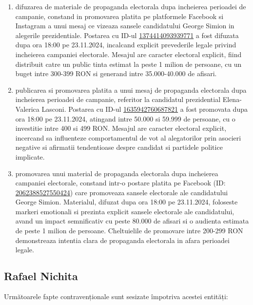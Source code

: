 \documentclass[a4paper,12pt]{article}
\begin{document}
\begin{enumerate}[leftmargin=*, label=\arabic*.)]
    \item difuzarea de materiale de propaganda electorala dupa incheierea perioadei de campanie, constand in promovarea platita pe platformele Facebook si Instagram a unui mesaj ce vizeaza sansele candidatului George Simion in alegerile prezidentiale. Postarea cu ID-ul \href{https://www.facebook.com/ads/library/?id=1374414093939771}{1374414093939771} a fost difuzata dupa ora 18:00 pe 23.11.2024, incalcand explicit prevederile legale privind incheierea campaniei electorale. Mesajul are caracter electoral explicit, fiind distribuit catre un public tinta estimat la peste 1 milion de persoane, cu un buget intre 300-399 RON si generand intre 35.000-40.000 de afisari.
    \item publicarea si promovarea platita a unui mesaj de propaganda electorala dupa incheierea perioadei de campanie, referitor la candidatul prezidential Elena-Valerica Lasconi. Postarea cu ID-ul \href{https://www.facebook.com/ads/library/?id=1635942760687821}{1635942760687821} a fost promovata dupa ora 18:00 pe 23.11.2024, atingand intre 50.000 si 59.999 de persoane, cu o investitie intre 400 si 499 RON. Mesajul are caracter electoral explicit, incercand sa influenteze comportamentul de vot al alegatorilor prin asocieri negative si afirmatii tendentioase despre candidat si partidele politice implicate.
    \item promovarea unui material de propaganda electorala dupa incheierea campaniei electorale, constand intr-o postare platita pe Facebook (ID: \href{https://www.facebook.com/ads/library/?id=2062388527550424}{2062388527550424}) care promoveaza sansele electorale ale candidatului George Simion. Materialul, difuzat dupa ora 18:00 pe 23.11.2024, foloseste markeri emotionali si prezinta explicit sansele electorale ale candidatului, avand un impact semnificativ cu peste 80.000 de afisari si o audienta estimata de peste 1 milion de persoane. Cheltuielile de promovare intre 200-299 RON demonstreaza intentia clara de propaganda electorala in afara perioadei legale.
\end{enumerate}

\vspace{0.5cm}

\subsection{Rafael Nichita}
Următoarele fapte contravenționale sunt sesizate împotriva acestei entități:
\end{document}
